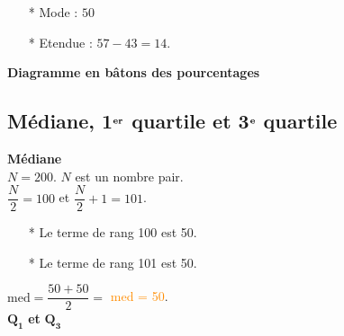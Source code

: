 \begin{itemize}
\item[*] Mode : $50$
\item[*] Etendue : $57 - 43 = 14$.
\end{itemize}

\medskip 

\begin{center}
\textbf{Diagramme en bâtons des pourcentages}

\end{center}

\newpage 

\subsection{Médiane, 1$^{\mathrm {\bf er}}$ quartile et 3$^{\mathrm{\bf e}}$ quartile}

\textbf{Médiane} \\

$ N = 200 $. $N$ est un nombre pair. \\

$\dfrac{N}{2} = 100 $ et $\dfrac{N}{2} + 1 = 101 $. \\

\begin{itemize}
\item[*] Le terme de rang 100 est 50.
\item[*] Le terme de rang 101 est 50.
\end{itemize}

\vspace*{.3cm}

$\mathrm{med} = \dfrac{50 + 50}{2} = $ 
      \textcolor {DarkOrange}{\Ovalbox {\textcolor{black}{50}} med = 50}. \\

$\mathbf{Q_1}$ \textbf{et} $\mathbf{Q_3}$ \\

